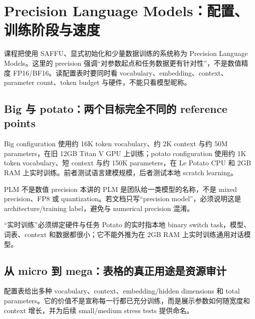 \section{Precision Language Models：配置、训练阶段与速度}

课程把使用 SAFFU、显式初始化和少量数据训练的系统称为 Precision Language Models。这里的 precision 强调“对参数起点和任务数据更有针对性”，不是数值精度 FP16/BF16。读配置表时要同时看 vocabulary、embedding、context、parameter count、token budget 与硬件，不能只看模型昵称。

\subsection{Big 与 potato：两个目标完全不同的 reference points}

Big configuration 使用约 16K token vocabulary、约 2K context 与约 50M parameters，在旧 12GB Titan V GPU 上训练；potato configuration 使用约 1K token vocabulary、短 context 与约 150K parameters，在 Le Potato CPU 和 2GB RAM 上实时训练。前者测试语言建模规模，后者测试本地 scratch learning。


\begin{knowledgebox}{PLM 不是数值 precision}
本讲的 PLM 是团队给一类模型的名称，不是 mixed precision、FP8 或 quantization。若文档只写“precision model”，必须说明这是 architecture/training label，避免与 numerical precision 混淆。
\end{knowledgebox}

\begin{warningbox}{“实时训练”必须绑定硬件与任务}
Potato 的实时指本地 binary switch task，模型、词表、context 和数据都很小；它不能外推为在 2GB RAM 上实时训练通用对话模型。
\end{warningbox}


\subsection{从 micro 到 mega：表格的真正用途是资源审计}

配置表给出多种 vocabulary、context、embedding/hidden dimensions 和 total parameters。它的价值不是宣称每一行都已充分训练，而是展示参数如何随宽度和 context 增长，并为后续 small/medium stress tests 提供命名。

